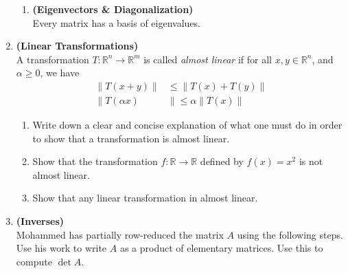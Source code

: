 \documentclass[red]{tutorial}
\newcommand{\R}{\mathbb{R}}
\newcommand{\mute}[1]{}
\theoremstyle{definition}
\theoremstyle{theorem}
\begin{document}
\begin{tutorial}
\begin{enumerate}
\begin{enumerate}
        \item \textbf{(Eigenvectors \& Diagonalization)}\\
          Every matrix has a basis of eigenvalues.
      \end{enumerate}
      \mute{
    \item %
      Sam has a function $T\colon\R^n\to \R^m$, which has the following
      property:
      \begin{center}
        For any subspace $V\subset \R^n$, we have $T(V)$ is a subspace of $\R^m$.
      \end{center}
      \begin{enumerate}
        \item What are the possible values of $T(\vec0)$?
        \item Sam says that their function is not linear. Can this be true?
      \end{enumerate}
      }
    \item \textbf{(Linear Transformations)}\\
      A transformation $T:\R^n\to \R^m$ is called 
      \textit{almost linear} if for all $x,y\in \R^n$, and 
      $\alpha\ge 0$, we have 
      \begin{align*}
        \|T(x+y)\| &\le \|T(x)+T(y)\|\\
        \|T(\alpha x)&\|\le \alpha \|T(x)\|
      \end{align*}
      \begin{enumerate}
        \item Write down a clear and concise explanation of what 
          one must do in order to show that a transformation is 
          almost linear.
        \item Show that the transformation $f:\R\to\R$ defined 
          by $f(x) = x^2$ is not almost linear.
        \item Show that any linear transformation in almost linear.
      \end{enumerate}
    \item \textbf{(Inverses)}\\
      Mohammed has partially row-reduced the matrix $A$ using the
      following steps. Use his work to write $A$ as a product of elementary
      matrices. Use this to compute $\det A$.
      \begin{align*}

\end{align*}
\end{enumerate}
\end{tutorial}
\end{document}
